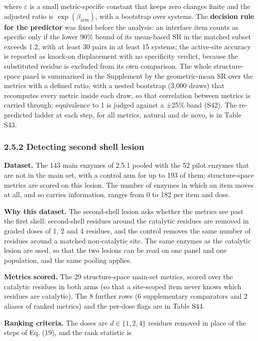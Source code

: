 \documentclass[
  10pt,
]{article}
\DeclareRobustCommand{\_}{\textunderscore\hspace{0pt}}
\begin{document}
where
\(\varepsilon\) is a
small
metric-specific
constant that keeps
zero changes finite
and the adjusted
ratio is
\(\exp(\beta_{\mathrm{arm}})\),
with a bootstrap
over systems. The
\textbf{decision
rule for the
predictor} was fixed
before the analysis:
an interface item
counts as specific
only if the lower
90\% bound of its
mean-based SR in the
matched subset
exceeds 1.2, with at
least 30 pairs in at
least 15 systems;
the active-site
accuracy is reported
as knock-on
displacement with no
specificity verdict,
because the
substituted residue
is excluded from its
own comparison. The
whole
structure-space
panel is summarised
in the Supplement by
the geometric-mean
SR over the metrics
with a defined
ratio, with a nested
bootstrap (3,000
draws) that
recomputes every
metric inside each
draw, so that
correlation between
metrics is carried
through; equivalence
to 1 is judged
against a ±25\% band
(S42). The
re-predicted ladder
at each step, for
all metrics, natural
and de novo, is in
Table S43.

\subsubsection{2.5.2
Detecting second
shell lesion}

\textbf{Dataset.}
The 143 main enzymes
of 2.5.1 pooled with
the 52 pilot enzymes
that are not in the
main set, with a
control arm for up
to 193 of them;
structure-space
metrics are scored
on this lesion. The
number of enzymes in
which an item moves
at all, and so
carries information,
ranges from 0 to 182
per item and dose.

\textbf{Why this
dataset.} The
second-shell lesion
asks whether the
metrics see past the
first shell:
second-shell
residues around the
catalytic residues
are removed in
graded doses of 1, 2
and 4 residues, and
the control removes
the same number of
residues around a
matched
non-catalytic site.
The same enzymes as
the catalytic lesion
are used, so that
the two lesions can
be read on one panel
and one population,
and the same pooling
applies.

\textbf{Metrics
scored.} The 29
structure-space
main-set metrics,
scored over the
catalytic residues
in both arms (so
that a site-scoped
item never knows
which residues are
catalytic). The 8
further rows (6
supplementary
comparators and 2
aliases of ranked
metrics) and the
per-dose flags are
in Table S44.

\textbf{Ranking
criteria.} The doses
are
\(d \in \{1, 2, 4\}\)
residues removed in
place of the steps
of Eq. (19), and the
rank statistic is
\end{document}
